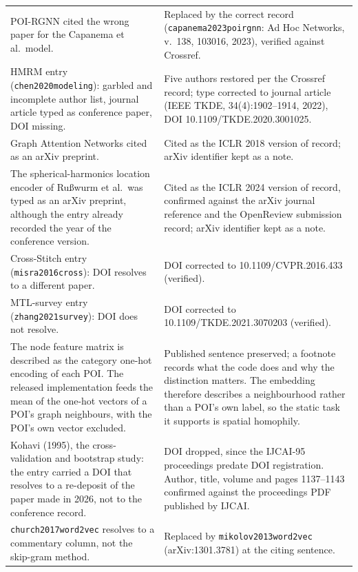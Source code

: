 {\begin{longtable}{@{}p{}p{}@{}}
POI-RGNN cited the wrong paper for the Capanema et al.\ model. &
Replaced by the correct record (\texttt{capanema2023poirgnn}: Ad Hoc Networks,
v.~138, 103016, 2023), verified against Crossref. \\
\addlinespace
HMRM entry (\texttt{chen2020modeling}): garbled and incomplete author list, journal
article typed as conference paper, DOI missing. &
Five authors restored per the Crossref record; type corrected to journal article
(IEEE TKDE, 34(4):1902--1914, 2022), DOI 10.1109/TKDE.2020.3001025. \\
\addlinespace
Graph Attention Networks cited as an arXiv preprint. &
Cited as the ICLR 2018 version of record; arXiv identifier kept as a note. \\
\addlinespace
The spherical-harmonics location encoder of Ru\ss{}wurm et al.\ was typed as an arXiv
preprint, although the entry already recorded the year of the conference version. &
Cited as the ICLR 2024 version of record, confirmed against the arXiv journal reference
and the OpenReview submission record; arXiv identifier kept as a note. \\
\addlinespace
Cross-Stitch entry (\texttt{misra2016cross}): DOI resolves to a different paper. &
DOI corrected to 10.1109/CVPR.2016.433 (verified). \\
\addlinespace
MTL-survey entry (\texttt{zhang2021survey}): DOI does not resolve. &
DOI corrected to 10.1109/TKDE.2021.3070203 (verified). \\
\addlinespace
The node feature matrix is described as the category one-hot encoding of each POI. The
released implementation feeds the mean of the one-hot vectors of a POI's graph
neighbours, with the POI's own vector excluded. &
Published sentence preserved; a footnote records what the code does and why the
distinction matters. The embedding therefore describes a neighbourhood rather than a
POI's own label, so the static task it supports is spatial homophily. \\
Kohavi (1995), the cross-validation and bootstrap study: the entry carried a DOI that
resolves to a re-deposit of the paper made in 2026, not to the conference record. &
DOI dropped, since the IJCAI-95 proceedings predate DOI registration. Author, title,
volume and pages 1137--1143 confirmed against the proceedings PDF published by IJCAI. \\
\addlinespace
\texttt{church2017word2vec} resolves to a commentary column, not the skip-gram
method. &
Replaced by \texttt{mikolov2013word2vec} (arXiv:1301.3781) at the citing sentence. \\

\end{longtable}}

